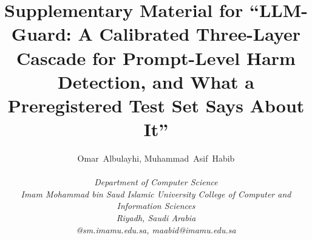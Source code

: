 \documentclass[journal]{IEEEtran}
\begin{document}
\title{Supplementary Material for ``LLM-Guard: A Calibrated Three-Layer Cascade for Prompt-Level Harm Detection, and What a Preregistered Test Set Says About It''}
\author{Omar~Albulayhi, Muhammad~Asif~Habib\\[2pt]
\parbox{\textwidth}{\centering\footnotesize \itshape Department of Computer Science\\
\itshape Imam Mohammad bin Saud Islamic University College of Computer and Information Sciences\\
\upshape Riyadh, Saudi Arabia\\
@sm.imamu.edu.sa, maabid@imamu.edu.sa}}
\maketitle


\end{document}
